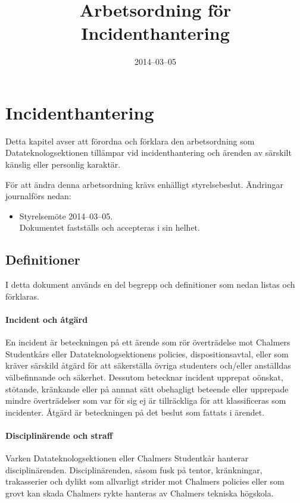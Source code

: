 \documentclass{dtek}
\title{Arbetsordning för Incidenthantering}
\date{2014--03--05}
\begin{document}
\makehf

\maketitle
\thispagestyle{fancy}

\section{Incidenthantering}

Detta kapitel avser att förordna och förklara den arbetsordning som Datateknologsektionen tillämpar vid incidenthantering och ärenden av särskilt känslig eller personlig karaktär.

För att ändra denna arbetsordning krävs enhälligt styrelsebeslut. Ändringar journalförs nedan:

\begin{itemize}
  \item Styrelsemöte 2014--03--05.\\
    Dokumentet fastställs och accepteras i sin helhet.
\end{itemize}


\subsection{Definitioner}

I detta dokument används en del begrepp och definitioner som nedan listas och förklaras.

\paragraph{Incident och åtgärd}
En incident är beteckningen på ett ärende som rör överträdelse mot Chalmers
Studentkårs eller Datateknologsektionens policies, dispositionsavtal, eller som
kräver särskild åtgärd för att säkerställa övriga studenters och/eller
anställdas välbefinnande och säkerhet. Dessutom betecknar incident upprepat
oönskat, stötande, kränkande eller på annnat sätt obehagligt beteende eller
upprepade mindre överträdelser som var för sig ej är tillräckliga för att
klassificeras som incidenter. Åtgärd är beteckningen på det beslut som fattats
i ärendet.

\paragraph{Disciplinärende och straff}
Varken Datateknologsektionen eller Chalmers Studentkår hanterar
disciplinärenden. Disciplinärenden, såsom fusk på tentor, kränkningar,
trakasserier och dylikt som allvarligt strider mot Chalmers policies eller som
grovt kan skada Chalmers rykte hanteras av Chalmers tekniska högskola.
\end{document}
